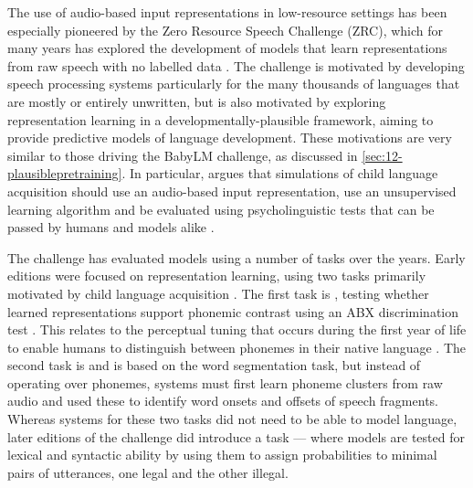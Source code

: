 The use of audio-based input representations in low-resource settings has been especially pioneered by the Zero Resource Speech Challenge (ZRC), which for many years has explored the development of models that learn representations from raw speech with no labelled data \citep[see][for an overview]{dunbar2022self}. The challenge is motivated by developing speech processing systems particularly for the many thousands of languages that are mostly or entirely unwritten, but is also motivated by exploring representation learning in a developmentally-plausible framework, aiming to provide predictive models of language development. These motivations are very similar to those driving the BabyLM challenge, as discussed in \cref{sec:12-plausiblepretraining}. In particular, \citet{dupoux-2018-cognitive} argues that simulations of child language acquisition should use an audio-based input representation, use an unsupervised learning algorithm and be evaluated using psycholinguistic tests that can be passed by humans and models alike \citet{dupoux-2018-cognitive}.


The challenge has evaluated models using a number of tasks over the years. Early editions were focused on representation learning, using two tasks primarily motivated by child language acquisition \citep{versteegh2015zero, dunbar2017zero}. The first task is , testing whether learned representations support phonemic contrast using an ABX discrimination test \citep{schatz2016abx}. This relates to the perceptual tuning that occurs during the first year of life to enable humans to distinguish between phonemes in their native language \citep{werker1984cross, kuhl1991human}. The second task is  and is based on the word segmentation task, but instead of operating over phonemes, systems must first learn phoneme clusters from raw audio and used these to identify word onsets and offsets of speech fragments. Whereas systems for these two tasks did not need to be able to model language, later editions of the challenge did introduce a  task \citep{dunbar2021zero} --- where models are tested for lexical and syntactic ability by using them to assign probabilities to minimal pairs of utterances, one legal and the other illegal.

